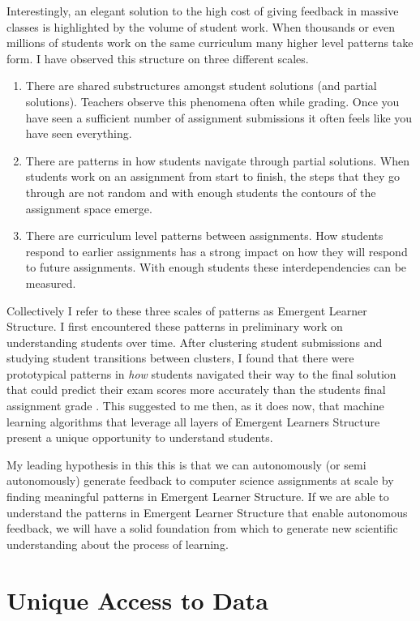 Interestingly, an elegant solution to the high cost of giving feedback in massive classes is highlighted by the volume of student work. When thousands or even millions of students work on the same curriculum many higher level patterns take form. I have observed this structure on three different scales. 
\begin{enumerate}
\item There are shared substructures amongst student solutions (and partial solutions). Teachers observe this phenomena often while grading. Once you have seen a sufficient number of assignment submissions it often feels like you have seen everything. 
\item There are patterns in how students navigate through partial solutions. When students work on an assignment from start to finish, the steps that they go through are not random and with enough students the contours of the assignment space emerge. 
\item There are curriculum level patterns between assignments. How students respond to earlier assignments has a strong impact on how they will respond to future assignments. With enough students these interdependencies can be measured.
\end{enumerate}
Collectively I refer to these three scales of patterns as Emergent Learner Structure. I first encountered these patterns in preliminary work on understanding students over time. After clustering student submissions and studying student transitions between clusters, I found that there were prototypical patterns in \emph{how} students navigated their way to the final solution that could predict their exam scores more accurately than the students final assignment grade \cite{piech2012modeling}. This suggested to me then, as it does now, that machine learning algorithms that leverage all layers of Emergent Learners Structure present a unique opportunity to understand students.

My leading hypothesis in this this is that we can autonomously (or semi autonomously) generate feedback to computer science assignments at scale by finding meaningful patterns in Emergent Learner Structure. 
If we are able to understand the patterns in Emergent Learner Structure that enable autonomous feedback, we will have a solid foundation from which to generate new scientific understanding about the process of learning. 




\section{Unique Access to Data}

